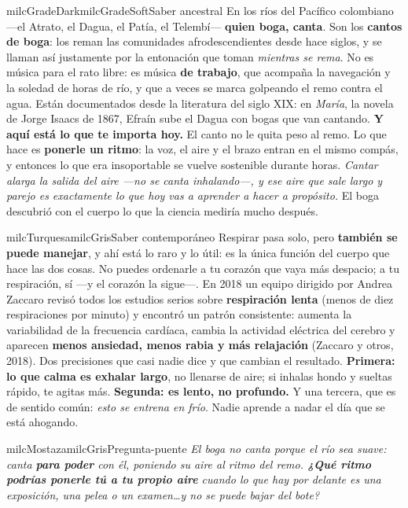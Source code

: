 \documentclass[11pt,letterpaper]{article}
\begin{document}
\begin{softbox}{milcGradeDark}{milcGradeSoft}{Saber ancestral}
En los ríos del Pacífico colombiano ---el Atrato, el Dagua, el Patía, el Telembí--- \textbf{quien boga, canta}. Son los \textbf{cantos de boga}: los reman las comunidades afrodescendientes desde hace siglos, y se llaman así justamente por la entonación que toman \emph{mientras se rema}. No es música para el rato libre: es música \textbf{de trabajo}, que acompaña la navegación y la soledad de horas de río, y que a veces se marca golpeando el remo contra el agua. Están documentados desde la literatura del siglo XIX: en \emph{María}, la novela de Jorge Isaacs de 1867, Efraín sube el Dagua con bogas que van cantando. \textbf{Y aquí está lo que te importa hoy.} El canto no le quita peso al remo. Lo que hace es \textbf{ponerle un ritmo}: la voz, el aire y el brazo entran en el mismo compás, y entonces lo que era insoportable se vuelve sostenible durante horas. \emph{Cantar alarga la salida del aire ---no se canta inhalando---, y ese aire que sale largo y parejo es exactamente lo que hoy vas a aprender a hacer a propósito.} El boga descubrió con el cuerpo lo que la ciencia mediría mucho después.
\end{softbox}

\begin{softbox}{milcTurquesa}{milcGris}{Saber contemporáneo}
Respirar pasa solo, pero \textbf{también se puede manejar}, y ahí está lo raro y lo útil: es la única función del cuerpo que hace las dos cosas. No puedes ordenarle a tu corazón que vaya más despacio; a tu respiración, sí ---y el corazón la sigue---. En 2018 un equipo dirigido por Andrea Zaccaro revisó todos los estudios serios sobre \textbf{respiración lenta} (menos de diez respiraciones por minuto) y encontró un patrón consistente: aumenta la variabilidad de la frecuencia cardíaca, cambia la actividad eléctrica del cerebro y aparecen \textbf{menos ansiedad, menos rabia y más relajación} (Zaccaro y otros, 2018). Dos precisiones que casi nadie dice y que cambian el resultado. \textbf{Primera: lo que calma es exhalar largo}, no llenarse de aire; si inhalas hondo y sueltas rápido, te agitas más. \textbf{Segunda: es lento, no profundo.} Y una tercera, que es de sentido común: \emph{esto se entrena en frío}. Nadie aprende a nadar el día que se está ahogando.
\end{softbox}

\begin{softbox}{milcMostaza}{milcGris}{Pregunta-puente}
\textit{El boga no canta porque el río sea suave: canta \textbf{para poder} con él, poniendo su aire al ritmo del remo. \textbf{¿Qué ritmo podrías ponerle tú a tu propio aire} cuando lo que hay por delante es una exposición, una pelea o un examen\ldots y no se puede bajar del bote?}
\end{softbox}
\end{document}
